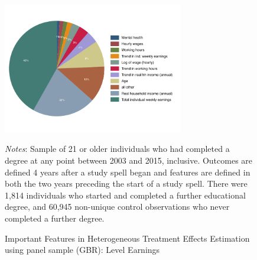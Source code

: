 \documentclass[12pt, a4paper]{article}
\begin{document}
\begin{figure}[H]
\centering
\caption{Important Features in Heterogeneous Treatment Effects Estimation using panel sample (GBR): Level Earnings}
\vspace{0.5cm}
  \label{fig:featgbr_panel}
    \includegraphics[width=0.7\textwidth]{_figures/influenceP_GBR_csnopoly.pdf}
\parbox{1\textwidth}{\footnotesize{\textit{Notes}: Sample of 21 or older individuals who had completed a degree at any point between 2003 and 2015, inclusive. Outcomes are defined 4 years after a study spell began and features are defined in both the two years preceding the start of a study spell. There were 1,814 individuals who started and completed a further educational degree, and 60,945 non-unique control observations who never completed a further degree.}}
\end{figure}
\end{document}
